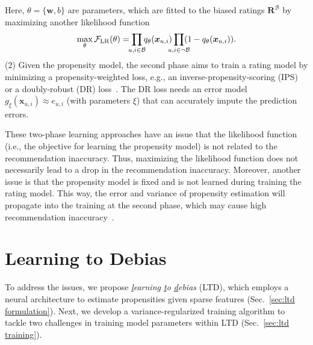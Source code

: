 \documentclass[letterpaper]{article} %
\newcommand{\matrixize}[1]{\mathbf{#1}}
\newcommand{\vectorize}[1]{\bm{#1}}
\newcommand{\lrdense}[2]{\smashoperator[lr]{#1_{#2}}}
\newcommand{\obsBiasedPairs}{\mathcal{B}}
\newcommand{\misBiasedPairs}{{\lnot\mathcal{B}}}
\newcommand{\trueRatings}{\matrixize{R}}
\newcommand{\featureMark}{x}
\newcommand{\biasedFeatures}{\vectorize{\featureMark}_{u,i}}
\newcommand{\likelihood}[1]{\mathcal{F}_{\rm #1}}
\newcommand{\lgBias}{b}
\newcommand{\lgWeight}{\vectorize{w}}
\newcommand{\errorName}{g}
\newcommand{\errorParam}{\xi}%
\newcommand{\errorModel}{\errorName_\errorParam(\biasedFeatures)}
\newcommand{\trueError}{e_{u,i}}
\newcommand{\propensityName}{q}
\newcommand{\propensityParam}{\theta}
\newcommand{\propensityModel}{\propensityName_\propensityParam(\biasedFeatures)}
\begin{document}
Here, $\propensityParam=\{\lgWeight,\lgBias\}$ are parameters, which are fitted to the biased ratings $\trueRatings^\obsBiasedPairs$ by maximizing another likelihood function
\begin{equation*}
\max_{\propensityParam}\likelihood{LR}(\propensityParam)
=\lrdense{\prod}{u,i\in\obsBiasedPairs}\propensityModel
\lrdense{\prod}{u,i\in\misBiasedPairs}(1-\propensityModel).
\end{equation*}%
(2) Given the propensity model, the second phase aims to train a rating model by minimizing a propensity-weighted loss, e.g., an inverse-propensity-scoring (IPS) or a doubly-robust (DR) loss~\cite{schnabel2016recommendations,wang2019doubly}.
The DR loss needs an error model $\errorModel\approx\trueError$ (with parameters $\errorParam$) that can accurately impute the prediction errors.

These two-phase learning approaches have an issue that the likelihood function (i.e., the objective for learning the propensity model) is not related to the recommendation inaccuracy.
Thus, maximizing the likelihood function does not necessarily lead to a drop in the recommendation inaccuracy.
Moreover, another issue is that the propensity model is fixed and is not learned during training the rating model.
This way, the error and variance of propensity estimation will propagate into the training at the second phase, which may cause high recommendation inaccuracy~\cite{schnabel2016recommendations}.


\section{Learning to Debias}
To address the issues, we propose \emph{\underline{l}earning \underline{t}o \underline{d}ebias} (LTD), which employs a neural architecture to estimate propensities given sparse features (Sec.~\ref{sec:ltd formulation}).
Next, we develop a variance-regularized training algorithm to tackle two challenges in training model parameters within LTD (Sec.~\ref{sec:ltd training}).
\end{document}
